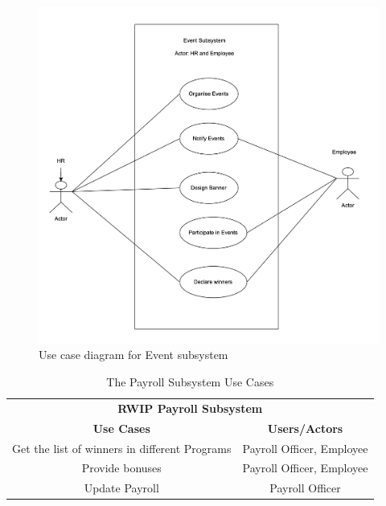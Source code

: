 \begin{figure}[h!t]
    \centering
    \includegraphics[width=\textwidth]
    {images/ucEvent.png}
    \caption{Use case diagram for Event subsystem}
    \label{fig:ucEvent}
\end{figure}

\begin{table}[h!t]
\caption{The Payroll Subsystem Use Cases}
{%
\newcommand{\mc}[2]{\multicolumn{#1}{#2}}
\begin{center}
\begin{tabular}{|c|c|}
\hline
\multicolumn{2}{|c|}{\textbf{RWIP Payroll Subsystem}} \\ \cline{1-2}
\textbf{Use Cases} & \textbf{Users/Actors} \\
\hline
\rule{0pt}{24pt} Get the list of winners in different Programs & Payroll Officer, Employee\\
\hline
\rule{0pt}{24pt}  Provide bonuses & Payroll Officer, Employee \\
\hline
\rule{0pt}{24pt}  Update Payroll & Payroll Officer \\
\hline
\end{tabular}
\end{center}
}%
\label{tab:payroll}
\end{table}

